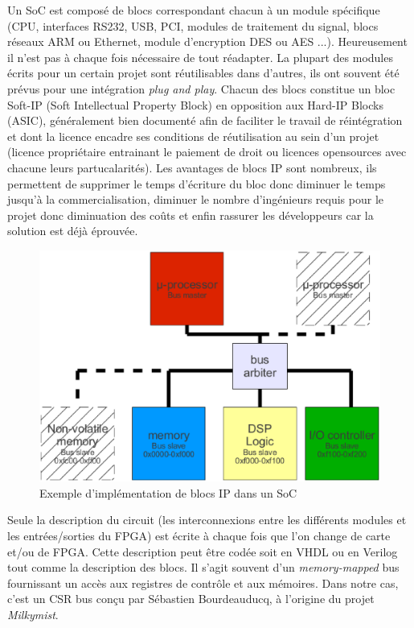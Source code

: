 Un SoC est composé de blocs correspondant chacun à un module spécifique (CPU, interfaces RS232, USB, PCI, modules de traitement du signal, blocs réseaux ARM ou Ethernet, module d'encryption DES ou AES ...). Heureusement il n'est pas à chaque fois nécessaire de tout réadapter. La plupart des modules écrits pour un certain projet sont réutilisables dans d'autres, ils ont souvent été prévus pour une intégration \textit{plug and play}. Chacun des blocs constitue un bloc Soft-IP (Soft Intellectual Property Block) en opposition aux Hard-IP Blocks (ASIC), généralement bien documenté afin de faciliter le travail de réintégration et dont la licence encadre ses conditions de réutilisation au sein d'un projet (licence propriétaire entrainant le paiement de droit ou licences opensources avec chacune leurs partucalarités). Les avantages de blocs IP sont nombreux, ils permettent de supprimer le temps d'écriture du bloc donc diminuer le temps jusqu'à la commercialisation, diminuer le nombre d'ingénieurs requis pour le projet donc diminuation des coûts  et enfin rassurer les développeurs car la solution est déjà éprouvée.
\medskip

\begin{figure}[!h]
\begin{center}
\includegraphics[scale=0.4]{soc_arch.eps}
\caption{Exemple d'implémentation de blocs IP dans un SoC}
\label{Fig_impl_blocs}
\end{center}
\end{figure}

Seule la description du circuit (les interconnexions entre les différents modules et les entrées/sorties du FPGA) est écrite à chaque fois que l'on change de carte et/ou de FPGA. Cette description peut être codée soit en VHDL ou en Verilog tout comme la description des blocs. Il s'agit souvent d'un \textit{memory-mapped} bus fournissant un accès aux registres de contrôle et aux mémoires. Dans notre cas, c'est un CSR bus conçu par Sébastien Bourdeauducq, à l'origine du projet \textit{Milkymist}.
\medskip


